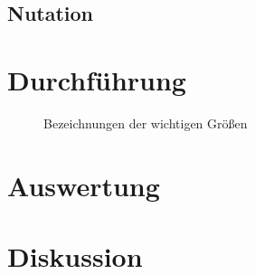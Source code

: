 \documentclass[12pt,a4paper,titlepage,headinclude,bibtotoc]{scrartcl}
\begin{document}
\subsection{Nutation}

 

 
\section{Durchführung}
\label{sec:durchfuehrung}

 \begin{figure}[htb]
 \centering \def\svgwidth{100pt}
 
\caption{Bezeichnungen der wichtigen Größen\label{img:wichtigegr}}
 \end{figure}


\section{Auswertung}
\label{sec:auswertung}

\section{Diskussion}
\label{sec:diskussion}
\end{document}
